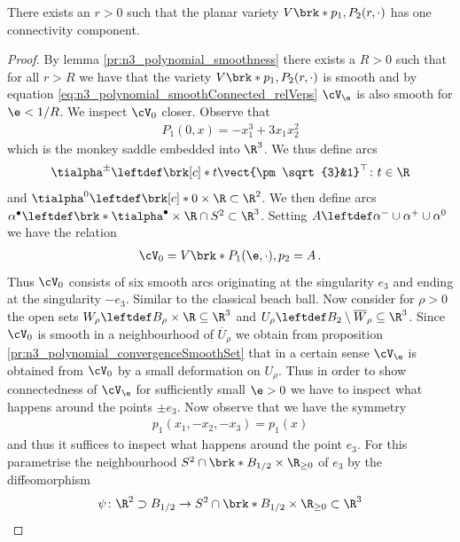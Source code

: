 \begin{lemma}[Connectedness]\label{pr:n3_polynomial_smoothConnected}
  There exists an $r>0$ such that the planar variety $V\brk*{p_1,P_2(r,\cdot)}$
  has one connectivity component.
\end{lemma}
\begin{proof}
  By lemma \ref{pr:n3_polynomial_smoothness} there exists a $R>0$ such that for all $r>R$ we have that the
  variety $V\brk*{p_1,P_2(r,\cdot)}$ is smooth and by equation \eqref{eq:n3_polynomial_smoothConnected_relVeps}
  $\cV_\e$ is also smooth for $\e<1/R$.
  We inspect $\cV_0$ closer.
  Observe that
  \begin{align*}
    P_1(0,x)=-x_1^3+3x_1x_2^2
  \end{align*}
  which is the monkey saddle embedded into $\R^3$. We thus define arcs
  \begin{align*}
    \tialpha^\pm\leftdef\brk[c]*{t\vect{\pm\sqrt{3}&1}^\top \colon t\in\R}
  \end{align*}
  and $\tialpha^0\leftdef\brk[c]*{0}\times\R\subset\R^2$.
  We then define arcs $\alpha^\bullet\leftdef\brk*{\tialpha^\bullet\times\R}\cap S^2\subset\R^3$.
  Setting $A\leftdef\alpha^-\cup\alpha^+\cup\alpha^0$
  we have the relation
  \begin{align*}
    \cV_0=V\brk*{P_1(\e,\cdot),p_2}
    =A\,.
  \end{align*}
  Thus $\cV_0$ consists of six smooth arcs originating at the singularity $e_3$ and
  ending at the singularity $-e_3$. Similar to the classical beach ball.
  Now consider for $\rho>0$ the open sets $W_\rho\leftdef B_\rho\times\R\subseteq\R^3$ and $U_\rho\leftdef B_2\setminus \overline{W}_\rho\subseteq\R^3$.
  Since $\cV_0$ is smooth in a neighbourhood of $\overline{U}_\rho$ we obtain from proposition \ref{pr:n3_polynomial_convergenceSmoothSet}
  that in a certain sense $\cV_\e$ is obtained from $\cV_0$ by a small deformation on $U_\rho$.
  Thus in order to show connectedness of $\cV_\e$ for sufficiently small $\e>0$ we have to inspect what happens
  around the points $\pm e_3$.
  Now observe that we have the symmetry
  \begin{align}
    p_1(x_1,-x_2,-x_3)=p_1(x)\label{eq:n3_polynomial_smoothConnected_symmetr}
  \end{align}
  and thus it suffices to inspect what happens around the point $e_3$.
  For this parametrise the neigh\-bour\-hood $S^2\cap \brk*{B_{1/2}\times\R_{\geq0}}$
  of $e_3$
  by the diffeomorphism
  \begin{align*}
    \psi\colon \R^2\supset B_{1/2}&\to S^2\cap \brk*{B_{1/2}\times\R_{\geq0}}\subset\R^3\\

\end{align*}
\end{proof}
